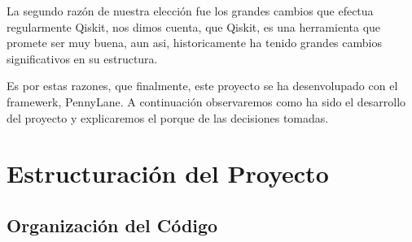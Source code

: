 La segundo razón de nuestra elección fue los grandes cambios que efectua regularmente Qiskit, nos dimos cuenta, que Qiskit, es una herramienta que promete ser muy buena, aun asi, historicamente ha tenido grandes cambios significativos en su estructura.

Es por estas razones, que finalmente, este proyecto se ha desenvolupado con el framewerk, PennyLane. A continuación observaremos como ha sido el desarrollo del proyecto y explicaremos el porque de las decisiones tomadas.

\section{Estructuración del Proyecto}

\subsection{Organización del Código}
